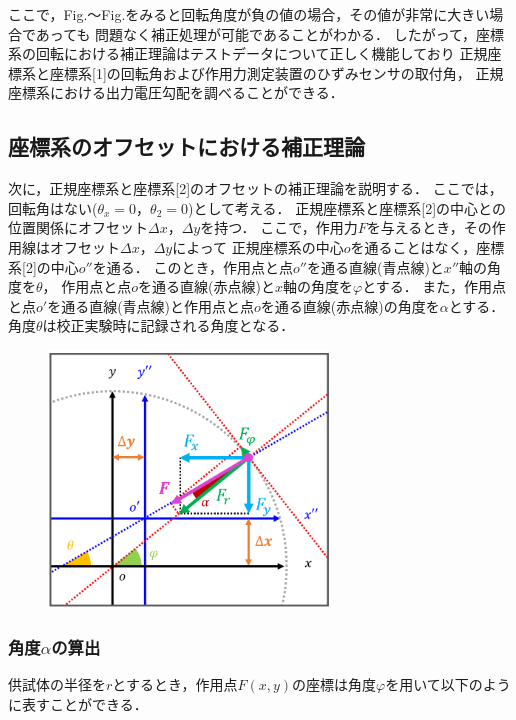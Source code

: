 ここで，Fig.～Fig.をみると回転角度が負の値の場合，その値が非常に大きい場合であっても
問題なく補正処理が可能であることがわかる．
したがって，座標系の回転における補正理論はテストデータについて正しく機能しており
正規座標系と座標系[1]の回転角および作用力測定装置のひずみセンサの取付角，
正規座標系における出力電圧勾配を調べることができる．

\subsection{座標系のオフセットにおける補正理論}

次に，正規座標系と座標系[2]のオフセットの補正理論を説明する．
ここでは，回転角はない($\theta_x = 0$，$\theta_2 = 0$)として考える．
正規座標系と座標系[2]の中心との位置関係にオフセット$\Delta x$，$\Delta y$を持つ．
ここで，作用力$F$を与えるとき，その作用線はオフセット$\Delta x$，$\Delta y$によって
正規座標系の中心$o$を通ることはなく，座標系[2]の中心$o''$を通る．
このとき，作用点と点$o''$を通る直線(青点線)と$x''$軸の角度を$\theta$，
作用点と点$o$を通る直線(赤点線)と$x$軸の角度を$\varphi$とする．
また，作用点と点$o'$を通る直線(青点線)と作用点と点$o$を通る直線(赤点線)の角度を$\alpha$とする．
角度$\theta$は校正実験時に記録される角度となる．

\begin{figure}[htbp]
    \footnotesize
    \begin{center}
        \includegraphics[width=75mm]{images/34-1.png}
        \caption{}
    \end{center}
\end{figure}

\subsubsection{角度$\alpha$の算出}
供試体の半径を$r$とするとき，作用点$F(x,y)$の座標は角度$\varphi$を用いて以下のように表すことができる．

